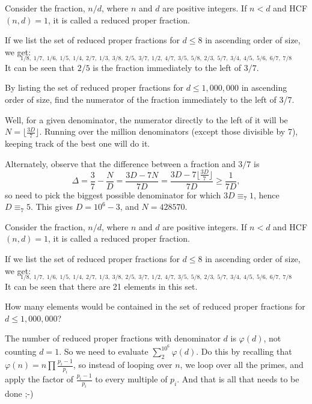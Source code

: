 Consider the fraction, $n/d$, where $n$ and $d$ are positive integers. If $n<d$ and HCF$(n,d)=1$, it is called a reduced proper fraction.

If we list the set of reduced proper fractions for $d \leq 8$ in ascending order of size, we get:
\vspace{-0.25cm}
$$ _{1/8,\; 1/7, \; 1/6,\; 1/5,\; 1/4,\; 2/7,\; 1/3,\; 3/8,\; 2/5,\; 3/7,\; 1/2,\; 4/7,\; 3/5,\; 5/8,\; 2/3,\; 5/7,\; 3/4,\; 4/5,\; 5/6,\; 6/7,\; 7/8}$$
It can be seen that $2/5$ is the fraction immediately to the left of $3/7$.

By listing the set of reduced proper fractions for $d \leq 1,000,000$ in ascending order of size, find the numerator of the fraction immediately to the left of 3/7.

Well, for a given denominator, the numerator directly to the left of it will be $N = \lfloor\tfrac{3D}{7}\rfloor$.  Running over the million denominators (except those divisible by 7), keeping track of the best one will do it.

Alternately, observe that the difference between a fraction and $3/7$ is
$$\Delta = \frac{3}{7} - \frac{N}D = \frac{3D-7N}{7D} = \frac{3D-7\lfloor\tfrac{3D}{7}\rfloor}{7D} \geq \frac1{7D},$$
so need to pick the biggest possible denominator for which $3D \equiv_7 1$, hence $D \equiv_7 5$.  This gives
$D = 10^6-3$, and $N = 428570$.




Consider the fraction, $n/d$, where $n$ and $d$ are positive integers. If $n<d$ and HCF$(n,d)=1$, it is called a reduced proper fraction.

If we list the set of reduced proper fractions for $d \leq 8$ in ascending order of size, we get:
\vspace{-0.25cm}
$$ _{1/8,\; 1/7, \; 1/6,\; 1/5,\; 1/4,\; 2/7,\; 1/3,\; 3/8,\; 2/5,\; 3/7,\; 1/2,\; 4/7,\; 3/5,\; 5/8,\; 2/3,\; 5/7,\; 3/4,\; 4/5,\; 5/6,\; 6/7,\; 7/8}$$
It can be seen that there are 21 elements in this set.

How many elements would be contained in the set of reduced proper fractions for $d \leq 1,000,000$?

The number of reduced proper fractions with denominator $d$ is $\varphi(d)$, not counting $d=1$.  So we need to evaluate
$\sum_{2}^{10^6} \varphi(d)$.  Do this by recalling that $\varphi(n) = n \prod \tfrac{p_i-1}{p_i}$, so instead of looping over $n$, we loop over all the primes, and apply the factor of $\tfrac{p_i-1}{p_i}$ to every multiple of $p_i$.  And that is all that needs to be done ;-)

